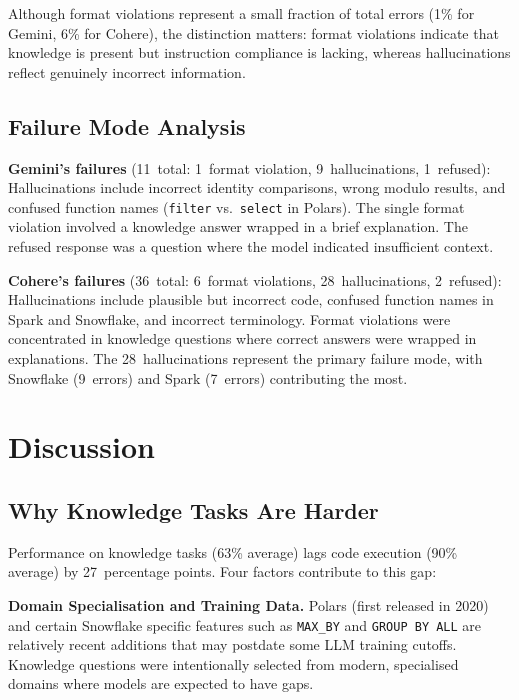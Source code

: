 \documentclass[12pt,a4paper]{article}
\begin{document}
Although format violations represent a small fraction of total errors (1\% for Gemini, 6\% for Cohere), the distinction matters: format violations indicate that knowledge is present but instruction compliance is lacking, whereas hallucinations reflect genuinely incorrect information.

\subsection{Failure Mode Analysis}

\textbf{Gemini's failures} (11~total: 1~format violation, 9~hallucinations, 1~refused): Hallucinations include incorrect identity comparisons, wrong modulo results, and confused function names (\texttt{filter} vs.\ \texttt{select} in Polars). The single format violation involved a knowledge answer wrapped in a brief explanation. The refused response was a question where the model indicated insufficient context.

\textbf{Cohere's failures} (36~total: 6~format violations, 28~hallucinations, 2~refused): Hallucinations include plausible but incorrect code, confused function names in Spark and Snowflake, and incorrect terminology. Format violations were concentrated in knowledge questions where correct answers were wrapped in explanations. The 28~hallucinations represent the primary failure mode, with Snowflake (9~errors) and Spark (7~errors) contributing the most.

\section{Discussion}

\subsection{Why Knowledge Tasks Are Harder}

Performance on knowledge tasks (63\% average) lags code execution (90\% average) by 27~percentage points. Four factors contribute to this gap:

\textbf{Domain Specialisation and Training Data.} Polars (first released in 2020) and certain Snowflake specific features such as \texttt{MAX\_BY} and \texttt{GROUP BY ALL} are relatively recent additions that may postdate some LLM training cutoffs. Knowledge questions were intentionally selected from modern, specialised domains where models are expected to have gaps.
\end{document}
